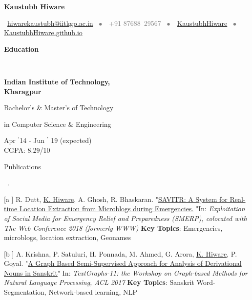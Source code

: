\documentclass[11pt, a4paper]{resume}
\newcommand{\important}[1]{
	\textcolor{mypurple}{#1}
}
\newcommand{\greyed}[1]{
	\textcolor{gray}{#1}
}
\newcommand{\titleX}[1]{
	\begin{LARGE}
    	\important{\centerline{\textbf{#1}}}
    \end{LARGE}
}
\newcommand{\fillit}[1]{
	\leavevmode\xleaders\hbox{#1}\hfill\kern0pt
}
\newcommand{\sectionTitle}[1]{
	\begin{Large}
    	\important{\textbf{#1}} 
    \end{Large}
    \important{\rlap{\rule[.5ex]{\linegoal}{0.5pt}}{}}
     \vspace{0.1em}\\
}
\newcommand{\sectionSubtitleX}[1]{
	\begin{large}
    \important{#1}
    \end{large}
    \fillit{\important{.}}
}
\newcommand{\education}[3]{ %
\noindent\parbox{.3\textwidth}{\bf #1\hfill}\parbox{.45\textwidth}{\hfil #2\hfil}\parbox{.25\textwidth}{\hfill #3}
}
\begin{document}
\titleX{Kaustubh Hiware}
\normalsize
\vspace{6pt}
\greyed{\centerline{\faEnvelopeO \, \href{mailto:hiwarekaustubh@iitkgp.ac.in}{ hiwarekaustubh@iitkgp.ac.in} \, $\bullet$ \,\faMobile\, +91 87688\, 29567 \, $\bullet$ \,\faGithub \, \href{https://github.com/kaustubhhiware}{KaustubhHiware} \,  $\bullet$ \, \faGlobe \, \href{https://kaustubhhiware.github.io}{KaustubhHiware.github.io}}}

\vspace{-2em}

\sectionTitle{Education\vspace{0.5em}}
\education{Indian Institute of Technology,\\ Kharagpur}{\centerline{Bachelor's \& Master's of Technology} \centerline{in Computer Science \& Engineering}}{Apr $^{\prime}$14 - Jun $^{\prime}$ 19 (expected) \\\hspace*{\fill} CGPA: 8.29/10}

\sectionSubtitleX{Publications}
\begin{list}{}{ %
    \setlength{\leftmargin}{1.5em} %
  }
\item [[a\hspace{-0.5em}]] R. Dutt, \underline{K. Hiware}, A. Ghosh, R. Bhaskaran. "\href{https://www.cse.iitk.ac.in/users/kripa/smerp2018/savitr-system-real-ritam.pdf}{SAVITR: A System for Real-time Location Extraction from Microblogs during Emergencies.} "In: \textit{Exploitation of Social Media for Emergency Relief and Preparedness (SMERP), colocated with The Web Conference 2018 (formerly WWW)} \hspace*{\fill}\textbf{\small Key Topics}: Emergencies, microblogs, location extraction, Geonames

\item [[b\hspace{-0.5em}]] A. Krishna, P. Satuluri, H. Ponnada, M. Ahmed, G. Arora, \underline{K. Hiware}, P. Goyal. "\href{http://www.aclweb.org/anthology/W17-2409}{A Graph Based Semi-Supervised Approach for Analysis of Derivational Nouns in Sanskrit}" In: \textit{TextGraphs-11: the Workshop on Graph-based Methods for Natural Language Processing, ACL 2017} \hspace*{\fill}\textbf{\small Key Topics}: Sanskrit Word-Segmentation, Network-based learning, NLP
\end{list}
\end{document}
